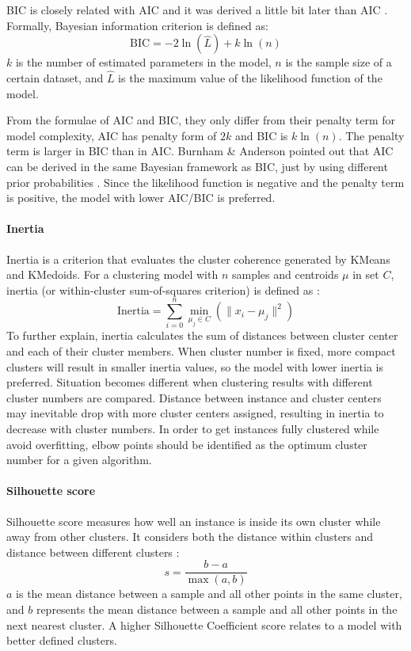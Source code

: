 \documentclass[a4paper]{article}
\begin{document}
BIC is closely related with AIC and it was derived a little bit later than AIC \cite{BIC}. Formally, Bayesian information criterion is defined as:
\begin{equation}
    \text{BIC}=-2\ln(\hat{L})+k\ln(n)
    \label{Eq: BIC}
\end{equation}
\noindent \(k\) is the number of estimated parameters in the model, \(n\) is the sample size of a certain dataset, and \(\hat{L}\) is the maximum value of the likelihood function of the model.

From the formulae of AIC and BIC, they only differ from their penalty term for model complexity, AIC has penalty form of \(2k\) and BIC is \(k\ln(n)\). The penalty term is larger in BIC than in AIC. Burnham \& Anderson pointed out that AIC can be derived in the same Bayesian framework as BIC, just by using different prior probabilities \cite{AIC_BIC_comparison}\cite{AIC_BIC_book}. Since the likelihood function is negative and the penalty term is positive, the model with lower AIC/BIC is preferred.

\paragraph{Inertia}
Inertia is a criterion that evaluates the cluster coherence generated by KMeans and KMedoids. For a clustering model with \(n\) samples and centroids \(\mu\) in set \(C\), inertia (or within-cluster sum-of-squares criterion) is defined as \cite{scikit-learn}:
\begin{equation}
    \text{Inertia}=\sum_{i=0}^{n}\min_{\mu_{j} \in C} \left( \parallel x_i - \mu_j\parallel^2 \right)
    \label{Eq: inertia}
\end{equation}
\noindent To further explain, inertia calculates the sum of distances between cluster center and each of their cluster members. When cluster number is fixed, more compact clusters will result in smaller inertia values, so the model with lower inertia is preferred. Situation becomes different when clustering results with different cluster numbers are compared. Distance between instance and cluster centers may inevitable drop with more cluster centers assigned, resulting in inertia to decrease with cluster numbers. In order to get instances fully clustered while avoid overfitting, elbow points should be identified as the optimum cluster number for a given algorithm.

\paragraph{Silhouette score}
Silhouette score measures how well an instance is inside its own cluster while away from other clusters. It considers both the distance within clusters and distance between different clusters \cite{scikit-learn}:
\begin{equation}
    s = \frac{b-a}{\max(a, b)}
    \label{Eq: Silhouette score}
\end{equation}
\noindent \(a\) is the mean distance between a sample and all other points in the same cluster, and \(b\) represents the mean distance between a sample and all other points in the next nearest cluster. A higher Silhouette Coefficient score relates to a model with better defined clusters. 
\end{document}
